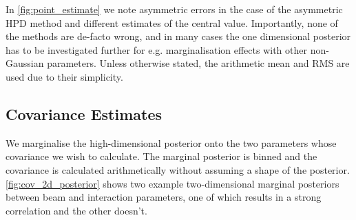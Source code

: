 In \autoref{fig:point_estimate} we note asymmetric errors in the case of the asymmetric HPD method and different estimates of the central value. Importantly, none of the methods are de-facto wrong, and in many cases the one dimensional posterior has to be investigated further for e.g. marginalisation effects with other non-Gaussian parameters. Unless otherwise stated, the arithmetic mean and RMS are used due to their simplicity.

\subsection{Covariance Estimates}
We marginalise the high-dimensional posterior onto the two parameters whose covariance we wish to calculate. The marginal posterior is binned and the covariance is calculated arithmetically without assuming a shape of the posterior. \autoref{fig:cov_2d_posterior} shows two example two-dimensional marginal posteriors between beam and interaction parameters, one of which results in a strong correlation and the other doesn't.
